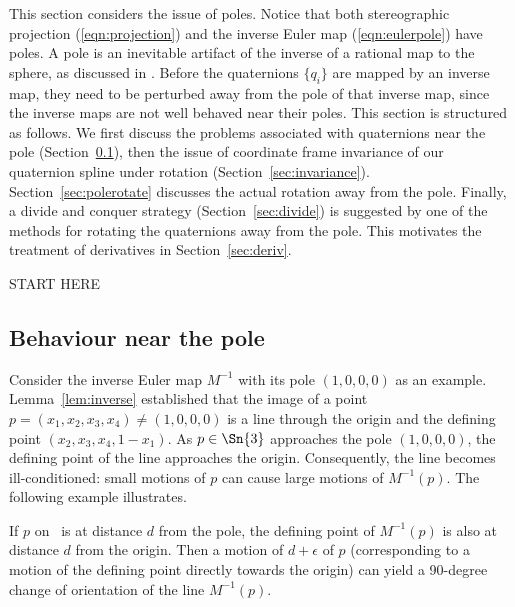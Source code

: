 \documentclass[11pt]{article}
\begin{document}
This section considers the issue of poles.
Notice that both stereographic projection (\ref{eqn:projection}) 
and the inverse Euler map (\ref{eqn:eulerpole}) have poles.
A pole is an inevitable artifact of the inverse of a rational map to the sphere, 
as discussed in \cite{jjrm0}.
Before the quaternions $\{q_i\}$ are mapped by an inverse map,
they need to be perturbed away from the pole of that inverse map,
since the inverse maps are not well behaved near their poles.
This section is structured as follows.
We first discuss the problems associated with quaternions near the pole 
(Section~\ref{sec:behaviour}), then the issue of coordinate frame invariance
of our quaternion spline under rotation (Section~\ref{sec:invariance}).
Section~\ref{sec:polerotate} discusses the actual rotation away from the pole.
Finally, a divide and conquer strategy (Section~\ref{sec:divide}) is suggested by one 
of the methods for rotating the quaternions away from the pole.
This motivates the treatment of derivatives in Section~\ref{sec:deriv}.

START HERE

\subsection{Behaviour near the pole}
\label{sec:behaviour}

Consider the inverse Euler map $M^{-1}$ with its pole $(1,0,0,0)$ as an example.
Lemma~\ref{lem:inverse} established that the 
image of a point $p = (x_1,x_2,x_3,x_4) \neq (1,0,0,0)$ is a line through the
origin and the defining point $(x_2,x_3,x_4,1-x_1)$.
As $p \in \Sn{3}$ approaches the pole $(1,0,0,0)$,
the defining point of the line approaches the origin.
Consequently, the line becomes ill-conditioned:
small motions of $p$ can cause large motions of $M^{-1}(p)$.
The following example illustrates.

\begin{example}
If $p$ on \ is at distance $d$ from the pole,
the defining point of $M^{-1}(p)$ is also at distance $d$ from the
origin.
Then a motion of $d+\epsilon$ of $p$ (corresponding to a motion
of the defining point directly towards the origin) can yield
a 90-degree change of orientation of the line $M^{-1}(p)$.
\end{example}
\end{document}
